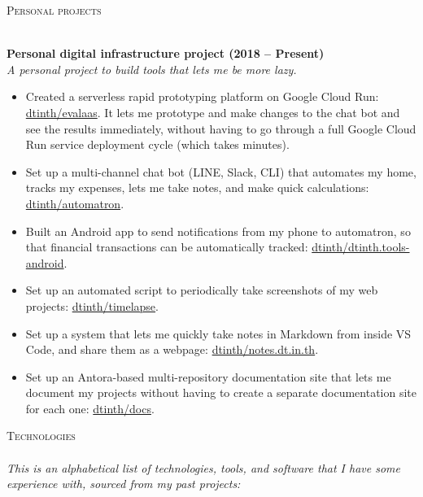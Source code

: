 \documentclass[a4paper]{article}
\newcommand{\lineunder} {
    \vspace*{-8pt} \\
    \hspace*{-18pt} \hrulefill \\
}
\newcommand{\header} [1] {
    {\hspace*{-18pt}\vspace*{6pt} \textsc{#1}}
    \vspace*{-6pt} \lineunder
}
\newcommand{\github} [1] {\href{https://github.com/#1}{#1}}
\begin{document}
\vspace{2mm}



\header{Personal projects}
\vspace{1mm}

\textbf{Personal digital infrastructure project (2018 – Present)}\\
\textit{A personal project to build tools that lets me be more lazy.}

\begin{itemize} \itemsep 1pt
    
	\item Created a serverless rapid prototyping platform on Google Cloud Run: \github{dtinth/evalaas}. It lets me prototype and make changes to the chat bot and see the results immediately, without having to go through a full Google Cloud Run service deployment cycle (which takes minutes).
    
	\item Set up a multi-channel chat bot (LINE, Slack, CLI) that automates my home, tracks my expenses, lets me take notes, and make quick calculations: \github{dtinth/automatron}.
    
	\item Built an Android app to send notifications from my phone to automatron, so that financial transactions can be automatically tracked: \github{dtinth/dtinth.tools-android}.
    
	\item Set up an automated script to periodically take screenshots of my web projects: \github{dtinth/timelapse}.
    
	\item Set up a system that lets me quickly take notes in Markdown from inside VS Code, and share them as a webpage: \github{dtinth/notes.dt.in.th}.
    
	\item Set up an Antora-based multi-repository documentation site that lets me document my projects without having to create a separate documentation site for each one: \github{dtinth/docs}.
    
\end{itemize}

\vspace{2mm}





\header{Technologies}

\textit{This is an alphabetical list of technologies, tools, and software that I have some experience with, sourced from my past projects:}
\end{document}
